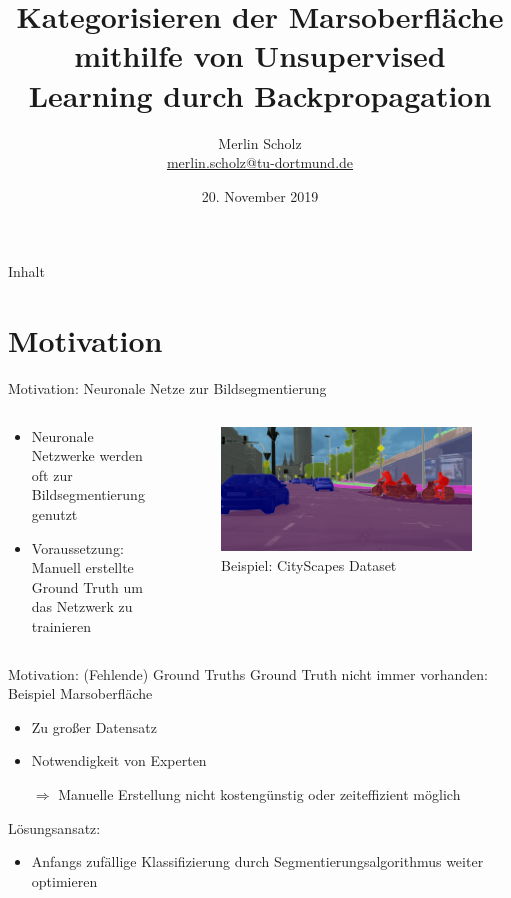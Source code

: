 \documentclass[9pt]{beamer}
\author[Merlin Scholz]{Merlin Scholz\\\href{mailto:merlin.scholz@tu-dortmund.de}{merlin.scholz@tu-dortmund.de}}
\title[Analyse der Marsoberfläche durch Unsupervised Learning]{Kategorisieren der Marsoberfläche mithilfe von Unsupervised Learning durch Backpropagation}
\date[20.11.2019]{20. November 2019}
\institute[TU Dortmund]{Mustererkennung,\\ Informatik XII, Technische Universität Dortmund}
\begin{document}
\begin{frame}
	\titlepage
\end{frame}

\begin{frame}{Inhalt}
	\tableofcontents
\end{frame}

\section{Motivation}

\begin{frame}{Motivation: Neuronale Netze zur Bildsegmentierung}
\begin{columns}
	\begin{column}{.5\textwidth}
		\begin{itemize}
			\item Neuronale Netzwerke werden oft zur Bildsegmentierung genutzt
			\item Voraussetzung: Manuell erstellte Ground Truth um das Netzwerk zu trainieren
			\end{itemize}
	\end{column}
	\begin{column}{.5\textwidth}
		\begin{figure}[H]
			\includegraphics[width=\textwidth,keepaspectratio]{koeln00.png}
			\caption{Beispiel: CityScapes Dataset\cite{Cordts_2016_CVPR}}
		\end{figure}
	\end{column}
\end{columns}
\end{frame}

\begin{frame}{Motivation: (Fehlende) Ground Truths}
Ground Truth nicht immer vorhanden: Beispiel Marsoberfläche
\begin{itemize}
	\item Zu großer Datensatz
	\item Notwendigkeit von Experten
	\item[$\Rightarrow$] Manuelle Erstellung nicht kostengünstig oder zeiteffizient möglich
\end{itemize}
\medskip
Lösungsansatz:
\begin{itemize}
	\item Anfangs zufällige Klassifizierung durch Segmentierungsalgorithmus weiter optimieren
\end{itemize}
\end{frame}
\end{document}
